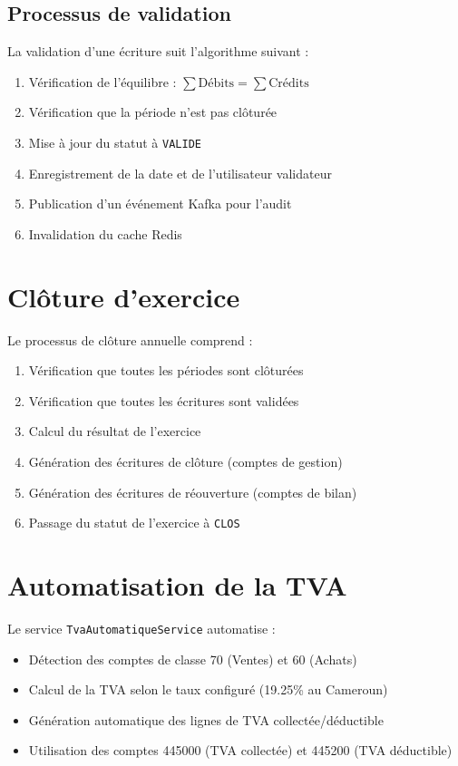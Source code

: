 \documentclass[12pt]{report}
\begin{document}
\subsection{Processus de validation}
La validation d'une écriture suit l'algorithme suivant :
\begin{enumerate}
    \item Vérification de l'équilibre : $\sum \text{Débits} = \sum \text{Crédits}$
    \item Vérification que la période n'est pas clôturée
    \item Mise à jour du statut à \texttt{VALIDE}
    \item Enregistrement de la date et de l'utilisateur validateur
    \item Publication d'un événement Kafka pour l'audit
    \item Invalidation du cache Redis
\end{enumerate}

\section{Clôture d'exercice}
Le processus de clôture annuelle comprend :
\begin{enumerate}
    \item Vérification que toutes les périodes sont clôturées
    \item Vérification que toutes les écritures sont validées
    \item Calcul du résultat de l'exercice
    \item Génération des écritures de clôture (comptes de gestion)
    \item Génération des écritures de réouverture (comptes de bilan)
    \item Passage du statut de l'exercice à \texttt{CLOS}
\end{enumerate}

\section{Automatisation de la TVA}
Le service \texttt{TvaAutomatiqueService} automatise :
\begin{itemize}
    \item Détection des comptes de classe 70 (Ventes) et 60 (Achats)
    \item Calcul de la TVA selon le taux configuré (19.25\% au Cameroun)
    \item Génération automatique des lignes de TVA collectée/déductible
    \item Utilisation des comptes 445000 (TVA collectée) et 445200 (TVA déductible)
\end{itemize}
\end{document}
